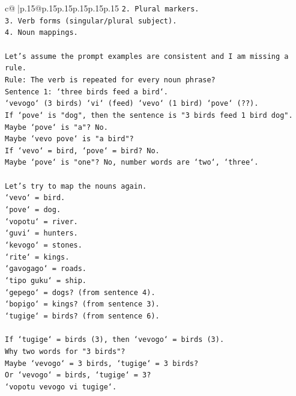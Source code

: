 \documentclass{article}
\begin{document}
{\begin{supertabular}{c@{$\;$}|p{.15\linewidth}@{}p{.15\linewidth}p{.15\linewidth}p{.15\linewidth}p{.15\linewidth}p{.15\linewidth}}
{{{\texttt{2. Plural markers.} \\
\texttt{3. Verb forms (singular/plural subject).} \\
\texttt{4. Noun mappings.} \\
\\ 
\texttt{Let's assume the prompt examples are consistent and I am missing a rule.} \\
\texttt{Rule: The verb is repeated for every noun phrase?} \\
\texttt{Sentence 1: `three birds feed a bird`.} \\
\texttt{`vevogo` (3 birds) `vi` (feed) `vevo` (1 bird) `pove` (??).} \\
\texttt{If `pove` is "dog", then the sentence is "3 birds feed 1 bird dog".} \\
\texttt{Maybe `pove` is "a"? No.} \\
\texttt{Maybe `vevo pove` is "a bird"?} \\
\texttt{If `vevo` = bird, `pove` = bird? No.} \\
\texttt{Maybe `pove` is "one"? No, number words are `two`, `three`.} \\
\\ 
\texttt{Let's try to map the nouns again.} \\
\texttt{`vevo` = bird.} \\
\texttt{`pove` = dog.} \\
\texttt{`vopotu` = river.} \\
\texttt{`guvi` = hunters.} \\
\texttt{`kevogo` = stones.} \\
\texttt{`rite` = kings.} \\
\texttt{`gavogago` = roads.} \\
\texttt{`tipo guku` = ship.} \\
\texttt{`gepego` = dogs? (from sentence 4).} \\
\texttt{`bopigo` = kings? (from sentence 3).} \\
\texttt{`tugige` = birds? (from sentence 6).} \\
\\ 
\texttt{If `tugige` = birds (3), then `vevogo` = birds (3).} \\
\texttt{Why two words for "3 birds"?} \\
\texttt{Maybe `vevogo` = 3 birds, `tugige` = 3 birds?} \\
\texttt{Or `vevogo` = birds, `tugige` = 3?} \\
\texttt{`vopotu vevogo vi tugige`.} \\
}}}
\end{supertabular}}
\end{document}
